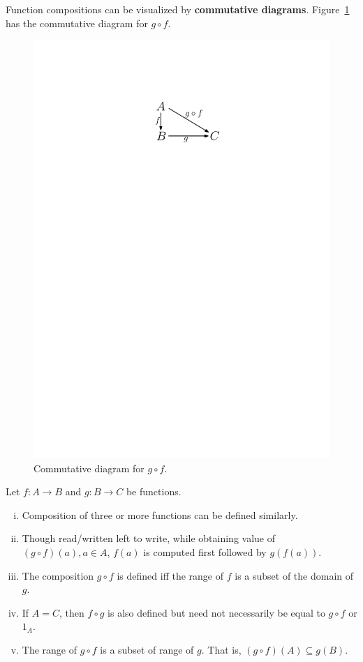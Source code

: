 \documentclass[a4paper,english,12pt]{article}
\begin{document}
Function compositions can be visualized by \textbf{commutative diagrams}. Figure~\ref{Fig:CommDiag} has the commutative diagram for $g\circ f$.
\begin{figure}[hhhh]
\centering
\includegraphics[scale=0.8]{Figures/l5f3_commdiag.pdf}
\caption{Commutative diagram for $g \circ f$.}
\label{Fig:CommDiag}
\end{figure}

\begin{rem} Let $f : A \to B$ and $g: B \to C$ be functions.
\begin{enumerate}[i)]
\item Composition of three or more functions can be defined similarly.
\item Though read/written left to write, while obtaining value of $(g\circ f)(a),a\in A$, $f(a)$ is computed first followed by $g(f(a))$.
\item %
The composition $g \circ f$ is defined iff the range of $f$ is a subset of the domain of $g$.
\item If $A=C$, then $f \circ g$ is also defined but need not necessarily be equal to $g\circ f$ or $1_A$.
\item The range of $g \circ f$ is a subset of range of $g$. That is, $(g\circ f)(A) \subseteq g(B)$.
\end{enumerate}
\end{rem}
\end{document}

